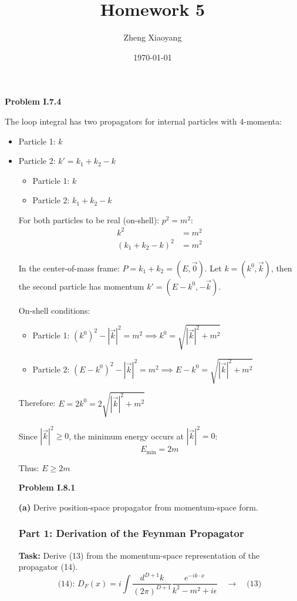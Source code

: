 \documentclass[11pt]{article}
\title{Homework 5}
\author{Zheng Xiaoyang}
\date{\today}
\begin{document}
\maketitle

\noindent\textbf{Problem I.7.4}

The loop integral has two propagators for internal particles with 4-momenta:
\begin{itemize}
    \item Particle 1: $k$
    \item Particle 2: $k' = k_1 + k_2 - k$

\begin{itemize}
    \item Particle 1: $k$
    \item Particle 2: $k_1 + k_2 - k$
\end{itemize}

For both particles to be real (on-shell): $p^2 = m^2$:
\begin{align}
    k^2 &= m^2 \\
    (k_1 + k_2 - k)^2 &= m^2
\end{align}

In the center-of-mass frame: $P = k_1 + k_2 = (E, \vec{0})$. Let $k = (k^0, \vec{k})$, then the second particle has momentum $k' = (E - k^0, -\vec{k})$.

On-shell conditions:
\begin{itemize}
    \item Particle 1: $(k^0)^2 - |\vec{k}|^2 = m^2 \implies k^0 = \sqrt{|\vec{k}|^2 + m^2}$
    \item Particle 2: $(E - k^0)^2 - |\vec{k}|^2 = m^2 \implies E - k^0 = \sqrt{|\vec{k}|^2 + m^2}$
\end{itemize}

Therefore: $E = 2k^0 = 2\sqrt{|\vec{k}|^2 + m^2}$

Since $|\vec{k}|^2 \ge 0$, the minimum energy occurs at $|\vec{k}|^2 = 0$:
$$E_{\text{min}} = 2m$$

Thus: $\boxed{E \ge 2m}$

\bigskip
\noindent\textbf{Problem I.8.1}

\textbf{(a)} Derive position-space propagator from momentum-space form.

\subsubsection{Part 1: Derivation of the Feynman Propagator}

\textbf{Task:} Derive (13) from the momentum-space representation of the propagator (14).
\[ \text{(14): } D_F(x) = i \int \frac{d^{D+1}k}{(2\pi)^{D+1}} \frac{e^{-ik \cdot x}}{k^2 - m^2 + i\epsilon} \quad \longrightarrow \quad \text{(13)} \]


\end{itemize}
\end{document}
